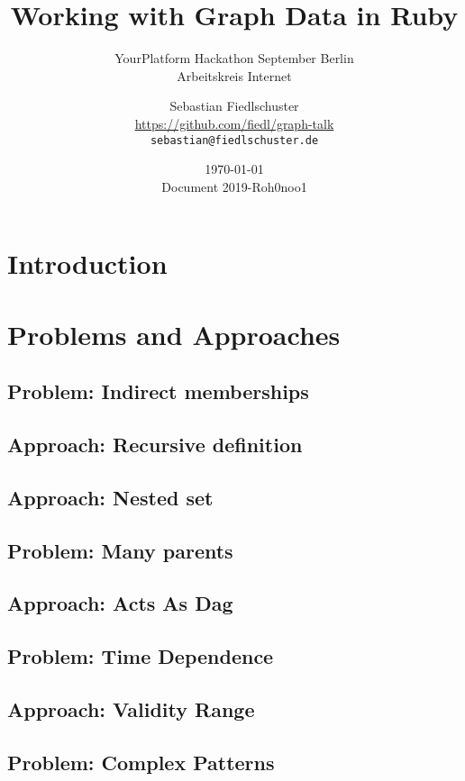 \documentclass[green, 12pt]{beamer}
\title[Working with Graph Data in Ruby, \url{https://github.com/fiedl/graph-talk}]{Working with Graph Data in Ruby}
\subtitle{YourPlatform Hackathon September Berlin\\Arbeitskreis Internet}
\date{\today \\ \vspace*{2mm} \tiny{Document 2019-Roh0noo1} \normalsize}
\author[Sebastian Fiedlschuster]{Sebastian Fiedlschuster \\ \small{\url{https://github.com/fiedl/graph-talk}} \\ \small\texttt{sebastian@fiedlschuster.de}}
\begin{document}



\section{Introduction}


\section{Problems and Approaches}
\subsection{Problem: Indirect memberships}

\subsection{Approach: Recursive definition}

\subsection{Approach: Nested set}

\subsection{Problem: Many parents}

\subsection{Approach: Acts As Dag}

\subsection{Problem: Time Dependence}

\subsection{Approach: Validity Range}

\subsection{Problem: Complex Patterns}

\end{document}
